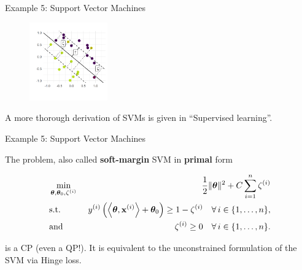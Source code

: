 \begin{frame}{Example 5: Support Vector Machines}
{	\begin{figure}
		\begin{center}
			\includegraphics[width=0.3\textwidth]{figure_man/boundary_with_violations.png}
		\end{center}
	\end{figure}
	}


\begin{footnotesize}
	A more thorough derivation of SVMs is given in ``Supervised learning''. 
\end{footnotesize}

\end{frame}	


%		
%		
%		

\begin{frame}{Example 5: Support Vector Machines}

The problem, also called \textbf{soft-margin} SVM in \textbf{primal} form

\begin{eqnarray*}
	& \min\limits_{\bm{\theta}, \bm{\theta}_0,\zeta^{(i)}} & \frac{1}{2} \|\bm{\theta}\|^2 + C   \sum_{i=1}^n \zeta^{(i)} \\
	& \text{s.t.} & \,\, y^{(i)}  \left( \left\langle \bm{\theta}, \mathbf{x}^{(i)} \right\rangle + \bm{\theta}_0 \right) \geq 1 - \zeta^{(i)} \quad \forall\, i \in \{1, \ldots, n\},\\
	& \text{and} & \,\, \zeta^{(i)} \geq 0 \quad \forall\, i \in \{1, \ldots, n\}.\\
\end{eqnarray*}

is a CP (even a QP!). It is equivalent to the unconstrained formulation of the SVM via Hinge loss. 
	
\end{frame}

